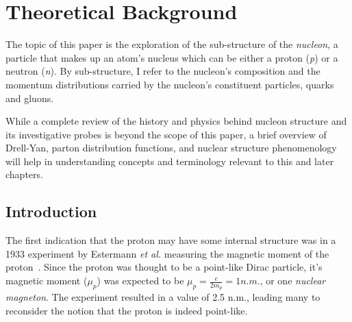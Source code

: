 \chapter{Theoretical Background}

The topic of this paper is the exploration of the sub-structure of the \emph{nucleon}, a particle that makes up an atom's nucleus which can be either a proton (\emph{p}) or a neutron (\emph{n}). By sub-structure, I refer to the nucleon's composition and the momentum distributions carried by the nucleon's constituent particles, quarks and gluons.

While a complete review of the history and physics behind nucleon structure and its investigative probes is beyond the scope of this paper, a brief overview of Drell-Yan, parton distribution functions, and nuclear structure phenomenology will help in understanding concepts and terminology relevant to this and later chapters.

\section{Introduction}

The first indication that the proton may have some internal structure was in a 1933 experiment by Estermann \emph{et al.} measuring the magnetic moment of the proton~\cite{Estermann:169E}. Since the proton was thought to be a point-like Dirac particle, it's magnetic moment ($\mu_p$) was expected to be $\mu_p = \frac{e}{2 m_p} = 1 n.m.$, or one \emph{nuclear magneton}. The experiment resulted in a value of 2.5 n.m., leading many to reconsider the notion that the proton is indeed point-like.

